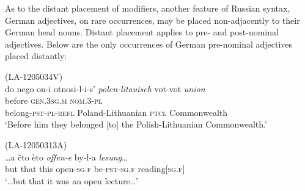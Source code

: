 As to the distant placement of modifiers, another feature of Russian syntax, German adjectives, on rare occurrences, may be placed non-adjacently to their German head nouns. Distant placement applies to pre- and post-nominal adjectives. Below are the only occurrences of German pre-nominal adjectives placed distantly: 

\ea
\label{ex:4:31}
(LA-1205034V)\\
\gll do nego on-i otnosi-l-i-s’ \textit{polen-litauisch}  vot-vot \textit{union} \\
	before \textsc{gen.3sg.m} \textsc{nom.3-pl}\\ belong-\textsc{pst-pl-refl} Poland-Lithuanian \textsc{ptcl} Commonwealth\\
\glt `Before him they belonged [to] the Polish-Lithuanian Commonwealth.'
\z

\ea
\label{ex:4:32}
(LA-12050313A)\\
\gll \dots a čto èto \textit{offen-e}  by-l-a \textit{lesung}\dots \\
	but that this open-\textsc{sg.f} be-\textsc{pst-sg.f} reading[\textsc{sg.f}]\\
\glt `\dots{but} that it was an open lecture\dots'
\z

